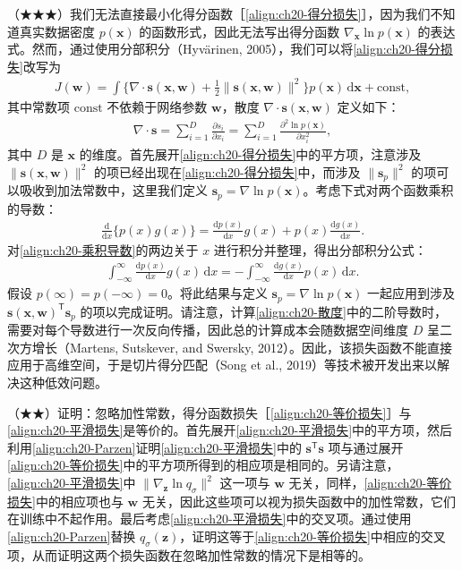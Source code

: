 \documentclass[../../main.tex]{subfiles}
\begin{document}
\begin{exercise}\label{exercise:ch20-16}
（★★★）我们无法直接最小化得分函数［\eqref{align:ch20-得分损失}］，因为我们不知道真实数据密度 $p(\bm{x})$ 的函数形式，因此无法写出得分函数 $\nabla_{\bm{x}}\ln p(\bm{x})$ 的表达式。然而，通过使用分部积分（Hyvärinen, 2005），我们可以将\eqref{align:ch20-得分损失}改写为
\begin{align}
J(\bm{w})=\int\Big\{\nabla\cdot\bm{s}(\bm{x},\bm{w})+\frac{1}{2}\big\|\bm{s}(\bm{x},\bm{w})\big\|^2\Big\}p(\bm{x})\,\mathrm{d}\bm{x}+\mathrm{const},
\label{align:ch20-得分损失改写}
\end{align}
其中常数项 $\mathrm{const}$ 不依赖于网络参数 $\bm{w}$，散度 $\nabla\cdot\bm{s}(\bm{x},\bm{w})$ 定义如下：
\begin{align}
\nabla\cdot\bm{s}=\sum_{i=1}^{D}\frac{\partial s_i}{\partial x_i}=\sum_{i=1}^{D}\frac{\partial^2\ln p(\bm{x})}{\partial x_i^2},
\label{align:ch20-散度}
\end{align}
其中 $D$ 是 $\bm{x}$ 的维度。首先展开\eqref{align:ch20-得分损失}中的平方项，注意涉及 $\|\bm{s}(\bm{x},\bm{w})\|^2$ 的项已经出现在\eqref{align:ch20-得分损失}中，而涉及 $\|\bm{s}_p\|^2$ 的项可以吸收到加法常数中，这里我们定义 $\bm{s}_p=\nabla\ln p(\bm{x})$。考虑下式对两个函数乘积的导数：
\begin{align}
\frac{\mathrm{d}}{\mathrm{d}x}\big\{p(x)g(x)\big\}=\frac{\mathrm{d}p(x)}{\mathrm{d}x}g(x)+p(x)\frac{\mathrm{d}g(x)}{\mathrm{d}x}.
\label{align:ch20-乘积导数}
\end{align}
对\eqref{align:ch20-乘积导数}的两边关于 $x$ 进行积分并整理，得出分部积分公式：
\begin{align}
\int_{-\infty}^{\infty}\frac{\mathrm{d}p(x)}{\mathrm{d}x}g(x)\,\mathrm{d}x=-\int_{-\infty}^{\infty}\frac{\mathrm{d}g(x)}{\mathrm{d}x}p(x)\,\mathrm{d}x.
\label{align:ch20-分部积分}
\end{align}
假设 $p(\infty)=p(-\infty)=0$。将此结果与定义 $\bm{s}_p=\nabla\ln p(\bm{x})$ 一起应用到涉及 $\bm{s}(\bm{x},\bm{w})^{\mathsf T}\bm{s}_p$ 的项以完成证明。请注意，计算\eqref{align:ch20-散度}中的二阶导数时，需要对每个导数进行一次反向传播，因此总的计算成本会随数据空间维度 $D$ 呈二次方增长（Martens, Sutskever, and Swersky, 2012）。因此，该损失函数不能直接应用于高维空间，于是切片得分匹配（Song et al., 2019）等技术被开发出来以解决这种低效问题。
\end{exercise}

\begin{exercise}\label{exercise:ch20-17}
（★★）证明：忽略加性常数，得分函数损失［\eqref{align:ch20-等价损失}］与\eqref{align:ch20-平滑损失}是等价的。首先展开\eqref{align:ch20-平滑损失}中的平方项，然后利用\eqref{align:ch20-Parzen}证明\eqref{align:ch20-平滑损失}中的 $\bm{s}^{\mathsf T}\bm{s}$ 项与通过展开\eqref{align:ch20-等价损失}中的平方项所得到的相应项是相同的。另请注意，\eqref{align:ch20-平滑损失}中 $\|\nabla_{\bm{z}}\ln q_{\sigma}\|^2$ 这一项与 $\bm{w}$ 无关，同样，\eqref{align:ch20-等价损失}中的相应项也与 $\bm{w}$ 无关，因此这些项可以视为损失函数中的加性常数，它们在训练中不起作用。最后考虑\eqref{align:ch20-平滑损失}中的交叉项。通过使用\eqref{align:ch20-Parzen}替换 $q_{\sigma}(\bm{z})$，证明这等于\eqref{align:ch20-等价损失}中相应的交叉项，从而证明这两个损失函数在忽略加性常数的情况下是相等的。
\end{exercise}
\end{document}
